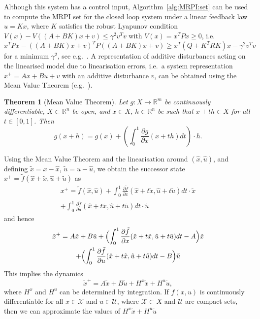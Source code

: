 \documentclass[journal]{IEEEtran}
\newcounter{thmcount}
\newtheorem{thm}[thmcount]{Theorem}
\theoremstyle{remark}
\theoremstyle{definition}
\begin{document}
%
Although this system has a control input, Algorithm~\ref{alg:MRPI:set} can be used to compute the MRPI set for the closed loop system under a linear feedback law $u=Kx$, where $K$ satisfies the robust 
Lyapunov condition $V(x)-V((A+BK)x+v)\leq \gamma^2v^Tv$ with $V(x)=x^T P x\geq0$, i.e. $x^TPx - ((A+BK)x+v)^TP(
(A+BK)x+v)\geq x^T(Q+K^TRK)x -\gamma^2 v^Tv$ for a minimum  $\gamma^2$, see e.g.~\cite{Boyd:94}.
%
A representation of additive disturbances acting on the linearised model due to linearisation errors, 
i.e.~a system representation $x^+=Ax + Bu + v$ with an additive disturbance $v$, can be obtained using the
Mean Value Theorem (e.g.~\cite{Apostol:1974}).
%
%
\begin{thm}[Mean Value Theorem]\label{thm:mean:value:theorem}
Let $g :  X \rightarrow\mathbb R^m$ be continuously
differentiable, $ X\subset\mathbb R^n$ be open,
and $x \in X$, $h \in\mathbb R^n$ be such that 
$x + th \in X$ for all $t\in [0 ,1]$. Then
\begin{equation}
  g(x+h) = g(x) + \left(\int_0^1 \frac{\partial g}{\partial x}(x+th)dt\right)\cdot h.
\end{equation}
\end{thm}
%
%
Using the Mean Value Theorem and the linearisation around $(\hat{x},\hat{u})$, and defining 
$\tilde{x} = x - \hat{x}$, $\tilde{u} = u - \hat{u}$, we obtain the successor state $x^+ = 
\tilde{f}(\hat{x} + \tilde{x},\hat{u} + \tilde{u})$ as
%
\begin{multline*}
x^+= \tilde f(\hat x, \hat u) 
+ \int_0^1\frac{\partial\tilde f}{\partial x}(\hat x + t\tilde x,
\hat u + t\tilde u) dt \cdot \tilde x  \\
+ \int_0^1\frac{\partial\tilde f}{\partial u}(\hat x + t\tilde x,\hat u+
t\tilde{u}) dt\cdot \tilde{u}
\end{multline*}
%
and hence
%
\begin{multline*}
\tilde x^+ = A\tilde{x} + B \tilde{u} +\Bigl(
\int_0^1\frac{\partial\tilde f}{\partial x}(\hat x + t\tilde x,\hat u
             + t\tilde{u})dt - A \Bigr)\tilde x 
\\ 
+\Bigl(\int_0^1\frac{\partial\tilde f}{\partial u}(\hat x +
  t\tilde x,\hat u + t\tilde{u})dt - B\Bigr)\tilde{u}
\end{multline*}
%
This implies the dynamics
%
\[
\tilde x^+ = A\tilde x+B\tilde{u} + H^x\tilde{x} + H^u \tilde{u}, 
\]
%
where $H^x$ and $H^u$ can be determined by integration. 
%
If $f(x,u)$ is continuously differentiable for all $x\in \mathcal{X}$ and $u\in\mathcal{U}$, where
$\mathcal{X}\subset X$ and $\mathcal{U}$ are compact sets, then we can approximate the values of $H^x \tilde{x}+ H^u \tilde{u}$ 
\end{document}
